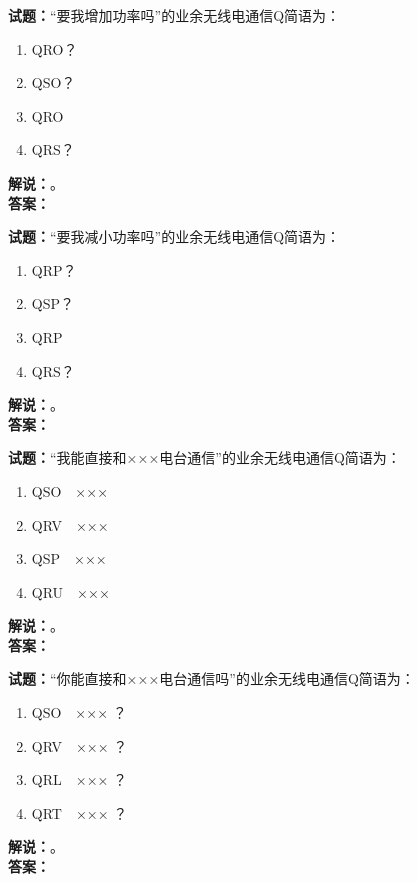 \documentclass{ctexbook}
\begin{document}
\vspace{\baselineskip}

\noindent\textbf{试题：}“要我增加功率吗”的业余无线电通信Q简语为：
\begin{enumerate}[leftmargin=3em]
  \item QRO？
  \item QSO？
  \item QRO
  \item QRS？
\end{enumerate}
\noindent\textbf{解说：}\textbf{}。\\\noindent\textbf{答案：}

\vspace{\baselineskip}

\noindent\textbf{试题：}“要我减小功率吗”的业余无线电通信Q简语为：
\begin{enumerate}[leftmargin=3em]
  \item QRP？
  \item QSP？
  \item QRP
  \item QRS？
\end{enumerate}
\noindent\textbf{解说：}\textbf{}。\\\noindent\textbf{答案：}

\vspace{\baselineskip}

\noindent\textbf{试题：}“我能直接和×××电台通信”的业余无线电通信Q简语为：
\begin{enumerate}[leftmargin=3em]
  \item QSO　×××
  \item QRV　×××
  \item QSP　×××
  \item QRU　×××
\end{enumerate}
\noindent\textbf{解说：}\textbf{}。\\\noindent\textbf{答案：}

\vspace{\baselineskip}

\noindent\textbf{试题：}“你能直接和×××电台通信吗”的业余无线电通信Q简语为：
\begin{enumerate}[leftmargin=3em]
  \item QSO　××× ？
  \item QRV　××× ？
  \item QRL　××× ？
  \item QRT　××× ？
\end{enumerate}
\noindent\textbf{解说：}\textbf{}。\\\noindent\textbf{答案：}
\end{document}
